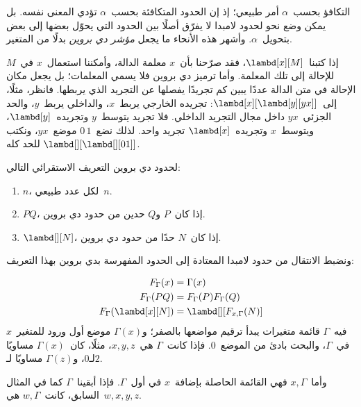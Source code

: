 \documentclass[../../../include/open-logic-section]{subfiles}
\begin{document}


التكافؤ بحسب~$\alpha$ أمر طبيعي؛ إذ إن الحدود المتكافئة بحسب~$\alpha$
تؤدي المعنى نفسه. بل يمكن وضع نحو لحدود لامبدا لا يفرّق أصلًا بين الحدود
التي يحوّل بعضها إلى بعض بتحويل~$\alpha$. وأشهر هذه الأنحاء ما يجعل
\emph{مؤشر دي بروين} بدلًا من المتغير.

إذا كتبنا~$\lambd[x][M]$، فقد صرّحنا بأن~$x$ معلمة الدالة، وأمكننا استعمال~$x$
في~$M$ للإحالة إلى تلك المعلمة. وأما ترميز دي بروين فلا يسمي المعلمات؛
بل يجعل مكان الإحالة في متن الدالة عددًا يبين كم تجريدًا يفصلها عن التجريد الذي يربطها.
فانظر، مثلًا، إلى~$\lambd[x][\lambd[y][y x]]$: تجريده الخارجي يربط~$x$، والداخلي يربط~$y$،
والحد الجزئي~$y x$ داخل مجال التجريد الداخلي.
فلا تجريد يتوسط~$y$ وتجريده~$\lambd[y]$، ويتوسط~$x$ وتجريده~$\lambd[x]$ تجريد واحد.
لذلك نضع~$0\, 1$ موضع~$y x$، ونكتب
$\lambd[][\lambd[][01]]$ للحد كله.

\begin{defn}
  لحدود دي بروين التعريف الاستقرائي التالي:
  \begin{enumerate}
  \item $n$، لكل عدد طبيعي~$n$.
  \item $PQ$، إذا كان~$P$ و$Q$ حدين من حدود دي بروين.
  \item $\lambd[][N]$، إذا كان~$N$ حدًا من حدود دي بروين.
  \end{enumerate}
\end{defn}

ونضبط الانتقال من حدود لامبدا المعتادة إلى الحدود المفهرسة بدي بروين بهذا التعريف:
\begin{defn}
  \begin{align*}
    F_\Gamma(x) &= \Gamma(x) \\
    F_\Gamma(PQ) &= F_\Gamma(P)F_\Gamma(Q) \\
    F_\Gamma(\lambd[x][N]) &= \lambd[][F_{x,\Gamma}(N)]
  \end{align*}
  فيه~$\Gamma$ قائمة متغيرات يبدأ ترقيم مواضعها بالصفر؛ و$\Gamma(x)$
  موضع أول ورود للمتغير~$x$ في~$\Gamma$، والبحث بادئ من الموضع~$0$.
  فإذا كانت~$\Gamma$ هي~$x,y,z$، مثلًا، كان~$\Gamma(x)$ مساويًا لـ$0$،
  و$\Gamma(z)$ مساويًا لـ$2$.
  
  وأما~$x,\Gamma$ فهي القائمة الحاصلة بإضافة~$x$ في أول~$\Gamma$.
  فإذا أبقينا~$\Gamma$ كما في المثال السابق، كانت~$w,\Gamma$ هي~$w,x,y,z$.
\end{defn}
\end{document}
